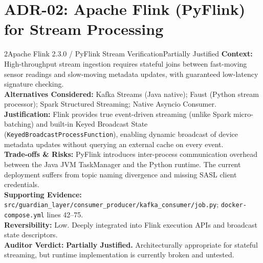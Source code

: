 \documentclass[10pt,a4paper]{report}
\begin{document}
\section{ADR-02: Apache Flink (PyFlink) for Stream Processing}
\begin{adrbox}{2}{Apache Flink 2.3.0 / PyFlink Stream Verification}{Partially Justified}
\textbf{Context:} High-throughput stream ingestion requires stateful joins between fast-moving sensor readings and slow-moving metadata updates, with guaranteed low-latency signature checking.\\
\textbf{Alternatives Considered:} Kafka Streams (Java native); Faust (Python stream processor); Spark Structured Streaming; Native Asyncio Consumer.\\
\textbf{Justification:} Flink provides true event-driven streaming (unlike Spark micro-batching) and built-in Keyed Broadcast State (\texttt{KeyedBroadcastProcessFunction}), enabling dynamic broadcast of device metadata updates without querying an external cache on every event.\\
\textbf{Trade-offs \& Risks:} PyFlink introduces inter-process communication overhead between the Java JVM TaskManager and the Python runtime. The current deployment suffers from topic naming divergence and missing SASL client credentials.\\
\textbf{Supporting Evidence:} \texttt{src/guardian\_layer/consumer\_producer/kafka\_consumer/job.py}; \texttt{docker-compose.yml} lines 42--75.\\
\textbf{Reversibility:} Low. Deeply integrated into Flink execution APIs and broadcast state descriptors.\\
\textbf{Auditor Verdict:} \textbf{Partially Justified.} Architecturally appropriate for stateful streaming, but runtime implementation is currently broken and untested.
\end{adrbox}
\end{document}
